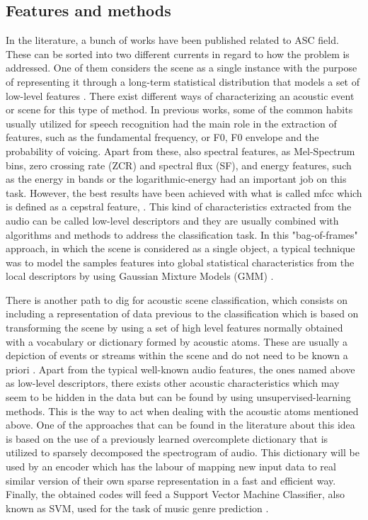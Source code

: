\subsection{Features and methods}
	
	In the literature, a bunch of works have been published related to ASC field. These can be sorted into two different currents in regard to how the problem is addressed. One of them considers the scene as a single instance with the purpose of representing it through a long-term statistical distribution that models a set of low-level features \cite{Stowell2015}. There exist different ways of characterizing an acoustic event or scene for this type of method. In previous works, some of the common habits usually utilized for speech recognition had the main role in the extraction of features, such as the fundamental frequency, or F0, F0 envelope and the probability of voicing. Apart from these, also spectral features, as Mel-Spectrum bins, zero crossing rate (ZCR) and spectral flux (SF), and energy features, such as the energy in bands or the logarithmic-energy \cite{Geiger2013} had an important job on this task. However, the best results have been achieved with what is called  \acrfull{mfcc}  which is defined as a cepstral feature, . This kind of characteristics extracted from the audio can be called low-level descriptors and they are usually combined with algorithms and methods to address the classification task. In this "bag-of-frames" approach, in which the scene is considered as a single object, a typical technique was to model the samples features into global statistical characteristics from the local descriptors by using Gaussian Mixture Models (GMM) \cite{Aucouturier2007}.
	
	There is another path to dig for acoustic scene classification, which consists on including a representation of data previous to the classification which is based on transforming the scene by using a set of high level features normally obtained with a vocabulary or dictionary formed by acoustic atoms. These are usually a depiction of events or streams within the scene and do not need to be known a priori \cite{Stowell2015}. Apart from the typical well-known audio features, the ones named above as low-level descriptors, there exists other acoustic characteristics which may seem to be hidden in the data but can be found by using unsupervised-learning methods. This is the way to act when dealing with the acoustic atoms mentioned above. 
	One of the approaches that can be found in the literature about this idea is based on the use of a previously learned overcomplete dictionary that is utilized to sparsely decomposed the spectrogram of audio. This dictionary will be used by an encoder which has the labour of mapping new input data to real similar version of their own sparse representation in a fast and efficient way. Finally, the obtained codes will feed a Support Vector Machine Classifier, also known as SVM, used for the task of music genre prediction \cite{Henaff2011}. 
	
